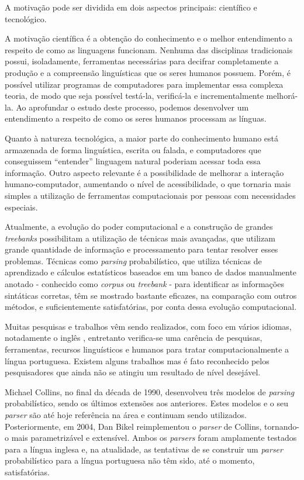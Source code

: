 A motivação pode ser dividida em dois aspectos principais: científico e tecnológico.

A motivação científica é a obtenção do conhecimento e o melhor entendimento a respeito de como as linguagens funcionam. Nenhuma das disciplinas tradicionais possui, isoladamente, ferramentas necessárias para decifrar completamente a produção e a compreensão linguísticas que os seres humanos possuem. Porém, é possível utilizar programas de computadores para implementar essa complexa teoria, de modo que seja possível testá-la, verificá-la e incrementalmente melhorá-la. Ao aprofundar o estudo deste processo, podemos desenvolver um entendimento a respeito de como os seres humanos processam as línguas.

Quanto à natureza tecnológica, a maior parte do conhecimento humano está armazenada de forma linguística, escrita ou falada, e computadores que conseguissem ``entender'' linguagem natural poderiam acessar toda essa informação. Outro aspecto relevante é a possibilidade de melhorar a interação humano-computador, aumentando o nível de acessibilidade, o que tornaria mais simples a utilização de ferramentas computacionais por pessoas com necessidades especiais.

Atualmente, a evolução do poder computacional e a construção de grandes \emph{treebanks} possibilitam a utilização de técnicas mais avançadas, que utilizam grande quantidade de informação e processamento para tentar resolver esses problemas. Técnicas como \emph{parsing} probabilístico, que utiliza técnicas de aprendizado e cálculos estatísticos baseados em um banco de dados manualmente anotado - conhecido como \emph{corpus} ou \emph{treebank} - para identificar as informações sintáticas corretas, têm se mostrado bastante eficazes, na comparação com outros métodos, e suficientemente satisfatórias, por conta dessa evolução computacional.

Muitas pesquisas e trabalhos vêm sendo realizados, com foco em vários idiomas, notadamente o inglês \cite{prolo03,charniak97,collins97}, entretanto verifica-se uma carência de pesquisas, ferramentas, recursos linguísticos e humanos para tratar computacionalmente a língua portuguesa.
Existem alguns trabalhos \cite{baldridge06,bick00,bonfante03} mas é fato reconhecido pelos pesquisadores que ainda não se atingiu um resultado de nível desejável.

Michael Collins, no final da década de 1990, desenvolveu três modelos de \emph{parsing} probabilístico, sendo os últimos extensões aos anteriores. Estes modelos e o seu \emph{parser} são até hoje referência na área e continuam sendo utilizados. Posteriormente, em 2004, Dan Bikel reimplementou o \emph{parser} de Collins, tornando-o mais parametrizável e extensível. Ambos os \emph{parsers} foram amplamente testados para a língua inglesa e, na atualidade, as tentativas de se construir um \emph{parser} probabilístico para a língua portuguesa não têm sido, até o momento, satisfatórias.

